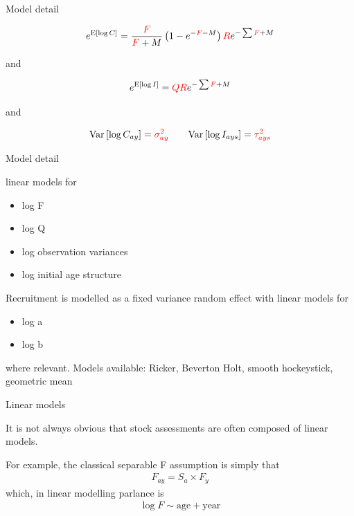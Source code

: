 \documentclass{beamer}\usepackage[]{graphicx}\usepackage[]{color}
\begin{document}
\begin{frame}{Model detail}

\begin{equation*}
e^{\text{E}\left[\log C\right]} = \frac{\color{red}F}{{\color{red}F}+M}\left(1 - e^{-{\color{red}F}-M}\right) {\color{red}R}e^{-\sum {\color{red}F} + M}
\end{equation*}

and

\begin{equation*}
e^{\text{E}\left[\log I\right]} = {\color{red}Q} {\color{red}R}e^{-\sum {\color{red}F} + M}
\end{equation*}

and

\begin{equation*}
\text{Var}\left[\log C_{ay}\right] = {\color{red}\sigma^2_{ay}} \qquad \text{Var}\left[\log I_{ays}\right] = {\color{red}\tau^2_{ays}}
\end{equation*}

\end{frame} 

\begin{frame}{Model detail}

linear models for
\begin{itemize}
  \item log F
  \item log Q
  \item log observation variances
  \item log initial age structure  
\end{itemize}

Recruitment is modelled as a \alert{fixed variance} random effect with linear models for
\begin{itemize}
  \item log a
  \item log b
\end{itemize}
where relevant.  Models available: Ricker, Beverton Holt, smooth hockeystick, geometric mean
\end{frame} 

\begin{frame}{Linear models}

It is not always obvious that stock assessments are often composed of linear models.

For example, the classical separable F assumption is simply that
\begin{align*}
F_{ay} = S_a \times F_y 
\end{align*}
which, in linear modelling parlance is
\begin{align*}
\log F \sim \text{age} + \text{year} 
\end{align*}

\end{frame}
\end{document}
